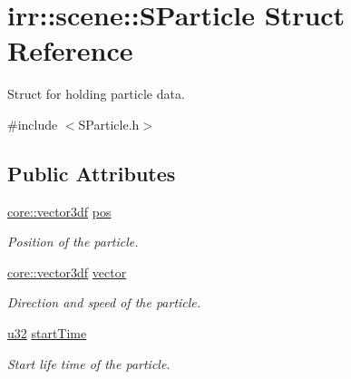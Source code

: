 \hypertarget{structirr_1_1scene_1_1SParticle}{}\section{irr\+:\+:scene\+:\+:S\+Particle Struct Reference}
\label{structirr_1_1scene_1_1SParticle}


Struct for holding particle data.  




{\ttfamily \#include $<$S\+Particle.\+h$>$}

\subsection*{Public Attributes}
\begin{DoxyCompactItemize}
\item 
\mbox{\label{structirr_1_1scene_1_1SParticle_a5f8e6fe3a892c8f734389dfcaf01fb05}} 
\hyperlink{namespaceirr_1_1core_a06f169d08b5c429f5575acb7edbad811}{core\+::vector3df} \hyperlink{structirr_1_1scene_1_1SParticle_a5f8e6fe3a892c8f734389dfcaf01fb05}{pos}
\begin{DoxyCompactList}\small\item\em Position of the particle. \end{DoxyCompactList}\item 
\mbox{\label{structirr_1_1scene_1_1SParticle_afaa96102f7effe71755e54c868e6eccd}} 
\hyperlink{namespaceirr_1_1core_a06f169d08b5c429f5575acb7edbad811}{core\+::vector3df} \hyperlink{structirr_1_1scene_1_1SParticle_afaa96102f7effe71755e54c868e6eccd}{vector}
\begin{DoxyCompactList}\small\item\em Direction and speed of the particle. \end{DoxyCompactList}\item 
\mbox{\label{structirr_1_1scene_1_1SParticle_aa546b47d4a54889e568a4c067816765c}} 
\hyperlink{namespaceirr_a0416a53257075833e7002efd0a18e804}{u32} \hyperlink{structirr_1_1scene_1_1SParticle_aa546b47d4a54889e568a4c067816765c}{start\+Time}
\begin{DoxyCompactList}\small\item\em Start life time of the particle. \end{DoxyCompactList}\item 

\end{DoxyCompactItemize}
